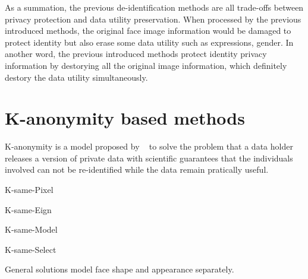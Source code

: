 	\par
	As a summation, the previous de-identification methods are all trade-offs between privacy protection and data utility preservation. When processed by the previous introduced methods, the original face image information would be damaged to protect identity but also erase some data utility such as expressions, gender. In another word, the previous introduced methods protect identity privacy information by destorying all the original image information, which definitely destory the data utility simultaneously. 

\section{K-anonymity based methods}
	K-anonymity is a model proposed by ~\cite{Sweeney02} to solve the problem that a data holder releases a version of private data with scientific guarantees that the individuals involved can not be re-identified while the data remain pratically useful. 

	\par
	K-same-Pixel

	\par
	K-same-Eign

	\par
	K-same-Model

	\par
	K-same-Select
	
	General solutions model face shape and appearance separately. 